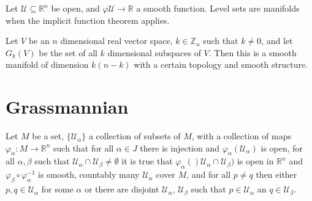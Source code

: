 \documentclass{article}                                                        %
\begin{document}
        \begin{example}
            Let $\mathcal{U}\subseteq\mathbb{R}^{n}$ be open, and
            $\varphi\mathcal{U}\rightarrow\mathbb{R}$ a smooth function.
            Level sets are manifolds when the implicit function theorem applies.
        \end{example}
        \begin{example}
            Let $V$ be an $n$ dimensional real vector space,
            $k\in\mathbb{Z}_{n}$ such that $k\ne{0}$, and let $G_{k}(V)$ be the
            set of all $k$ dimensional subspaces of $V$. Then this is a smooth
            manifold of dimension $k(n-k)$ with a certain topology and smooth
            structure.
        \end{example}
    \section{Grassmannian}
        \begin{theorem}
            Let $M$ be a set, $\{\mathcal{U}_{\alpha}\}$ a collection of subsets
            of $M$, with a collection of maps
            $\varphi_{\alpha}:M\rightarrow\mathbb{R}^{n}$ such that for all
            $\alpha\in{J}$ there is injection and
            $\varphi_{\alpha}(\mathcal{U}_{\alpha})$ is open, for all
            $\alpha,\beta$ such that
            $\mathcal{U}_{\alpha}\cap\mathcal{U}_{\beta}\ne\emptyset$ it is true
            that
            $\varphi_{\alpha}()\mathcal{U}_{\alpha}\cap\mathcal{U}_{\beta})$ is
            open in $\mathbb{R}^{n}$ and
            $\varphi_{\beta}\circ\varphi_{\alpha}^{\minus{1}}$ is smooth,
            countably many $\mathcal{U}_{\alpha}$ cover $M$, and for all
            $p\ne{q}$ then either $p,q\in\mathcal{U}_{\alpha}$ for some $\alpha$
            or there are disjoint $\mathcal{U}_{\alpha}$, $\mathcal{U}_{\beta}$
            such that $p\in\mathcal{U}_{\alpha}$ an
            $q\in\mathcal{U}_{\beta}$.
        \end{theorem}
\end{document}
